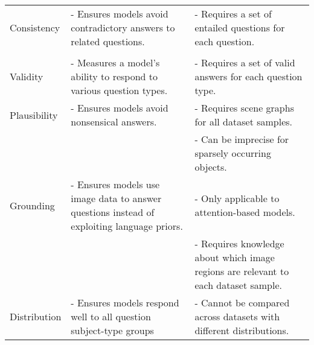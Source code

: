 \begin{table}[htbp]
\begin{footnotesize}
\begin{tabularx}{\linewidth}{@{}lLL@{}}
            Consistency                         & - Ensures models avoid contradictory answers to related questions.                         & - Requires a set of entailed questions for each question.                                                                                                               \\
                                                &                                                                                            &                                                                                                                     \\ \midrule
            Validity                            & - Measures a model's ability to respond to various question types.                         & - Requires a set of valid answers for each question type.                                                                                                               \\ \midrule
            Plausibility                        & - Ensures models avoid nonsensical answers.                                                & - Requires scene graphs for all dataset samples.                                                                                                                        \\
                                                &                                                                                            & - Can be imprecise for sparsely occurring objects.                                                                                                                      \\ \midrule
            Grounding                           & - Ensures models use image data to answer questions instead of exploiting language priors. & - Only applicable to attention-based models.                                                                                                                            \\
                                                &                                                                                            & - Requires knowledge about which image regions are relevant to each dataset sample.                                                                                     \\ \midrule
            Distribution                        & - Ensures models respond well to all question subject-type groups                          & - Cannot be compared across datasets with different distributions.                                                                                                                                                                       \\ \midrule

\end{tabularx}
\end{footnotesize}
\end{table}
